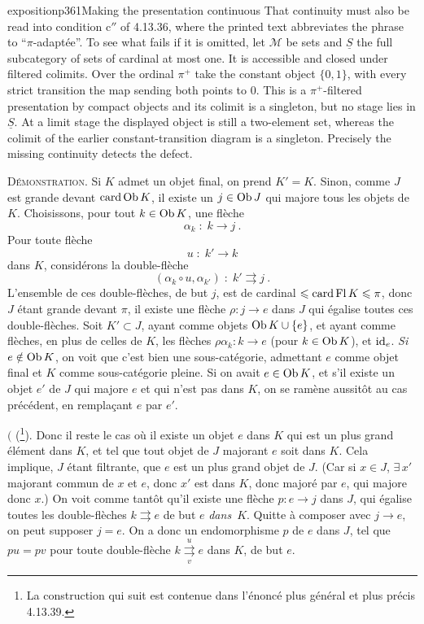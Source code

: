 \begin{dcomment}{exposition}{p361}{Making the presentation continuous}
That continuity must also be read into condition c$''$ of 4.13.36, where the printed text abbreviates the phrase to ``$\pi$-adaptée''. To see what fails if it is omitted, let $\mathcal M$ be sets and $\underline S$ the full subcategory of sets of cardinal at most one. It is accessible and closed under filtered colimits. Over the ordinal $\pi^+$ take the constant object $\{0,1\}$, with every strict transition the map sending both points to $0$. This is a $\pi^+$-filtered presentation by compact objects and its colimit is a singleton, but no stage lies in $\underline S$. At a limit stage the displayed object is still a two-element set, whereas the colimit of the earlier constant-transition diagram is a singleton. Precisely the missing continuity detects the defect.
\end{dcomment}


\textsc{Démonstration}. Si $K$ admet un objet final, on prend $K' = K$. Sinon, comme $J$ est grande devant $\operatorname{card} \operatorname{Ob} K$, il existe un $j \in \operatorname{Ob} J$ qui majore tous les objets de $K$. Choisissons, pour tout $k \in \operatorname{Ob} K$, une flèche
\[ \alpha_k \;:\; k \longrightarrow j \ . \]
Pour toute flèche
\[ u \;:\; k' \longrightarrow k \]
dans $K$, considérons la double-flèche
\[ (\alpha_k \circ u, \alpha_{k'}) \;:\; k' \rightrightarrows j \ . \]
L'ensemble de ces double-flèches, de but $j$, est de cardinal $\leqslant \operatorname{card} \operatorname{Fl} K \leqslant \pi$, donc $J$ étant grande devant $\pi$, il existe une flèche $\rho : j \longrightarrow e$ dans $J$ qui égalise toutes ces double-flèches. Soit $K' \subset J$, ayant comme objets $\operatorname{Ob} K \cup \{e\}$, et ayant comme flèches, en plus de
celles de $K$, les flèches $\rho\alpha_k : k \longrightarrow e$ (pour $k \in \operatorname{Ob} K$), et $\mathrm{id}_e$. \textit{Si} $e \notin \operatorname{Ob} K$, on voit que c'est bien une sous-catégorie, admettant $e$ comme objet final et $K$ comme sous-catégorie pleine. Si on avait $e \in \operatorname{Ob} K$, et s'il existe un objet $e'$ de $J$ qui majore $e$ et qui n'est pas dans $K$, on se ramène aussitôt au cas précédent, en remplaçant $e$ par $e'$.

$\Biggl($ (\footnote[161]{La construction qui suit est contenue dans l'énoncé plus général et plus précis 4.13.39.}). Donc il reste le cas où il existe un objet $e$ dans $K$ qui est un plus grand élément dans $K$, et tel que tout objet de $J$ majorant $e$ soit dans $K$. Cela implique, $J$ étant filtrante, que $e$ est un plus grand objet de $J$. (Car si $x \in J$, $\exists\, x'$ majorant commun de $x$ et $e$, donc $x'$ est dans $K$, donc majoré par $e$, qui majore donc $x$.) On voit comme tantôt qu'il existe une flèche $p : e \longrightarrow j$ dans $J$, qui égalise toutes les double-flèches $k \rightrightarrows e$ de but $e$ \textit{dans}~$K$. Quitte à composer avec $j \longrightarrow e$, on peut supposer $j = e$. On a donc un endomorphisme $p$ de $e$ dans $J$, tel que $pu = pv$ pour toute double-flèche $k \overset{u}{\underset{v}{\rightrightarrows}} e$ dans $K$, de but $e$.

